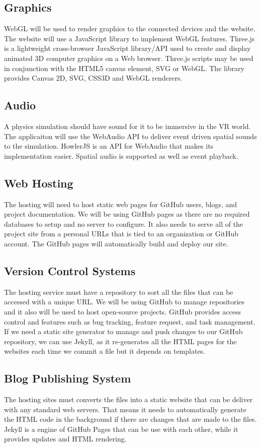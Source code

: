\documentclass[onecolumn, draftclsnofoot,10pt, compsoc]{IEEEtran}
\begin{document}
\subsection{Graphics}
WebGL will be used to render graphics to the connected devices and the website. The website will use a JavaScript library to implement WebGL features. Three.js is a lightweight cross-browser JavaScript library/API used to create and display animated 3D computer graphics on a Web browser. Three.js scripts may be used in conjunction with the HTML5 canvas element, SVG or WebGL. The library provides Canvas 2D, SVG, CSS3D and WebGL renderers.

\subsection{Audio}
A physics simulation should have sound for it to be immersive in the VR world. The applicaiton will use the WebAudio API to deliver event driven spatial sounds to the simulation. HowlerJS is an API for WebAudio that makes its implementation easier. Spatial audio is supported as well as event playback.

\subsection{Web Hosting}
The hosting will need to host static web pages for GitHub users, blogs, and project documentation. We will be using GitHub pages as there are no required databases to setup and no server to configure. It also needs to serve all of the project site from a personal URLs that is tied to an organization or GitHub account. The GitHub pages will automatically build and deploy our site. 

\subsection{Version Control Systems}
The hosting service must have a repository to sort all the files that can be accessed with a unique URL. We will be using GitHub to manage repositories and it also will be used to host open-source projects. GitHub provides access control and features such as bug tracking, feature request, and task management. If we need a static site generator to manage and push changes to our GitHub repository, we can use Jekyll, as it re-generates all the HTML pages for the websites each time we commit a file but it depends on templates. 

\subsection{Blog Publishing System}
The hosting sites must converts the files into a static website that can be deliver with any standard web servers. That means it needs to automatically generate the HTML code in the background if there are changes that are made to the files. Jekyll is a engine of GitHub Pages that can be use with each other, while it provides updates and HTML rendering. 
\end{document}
